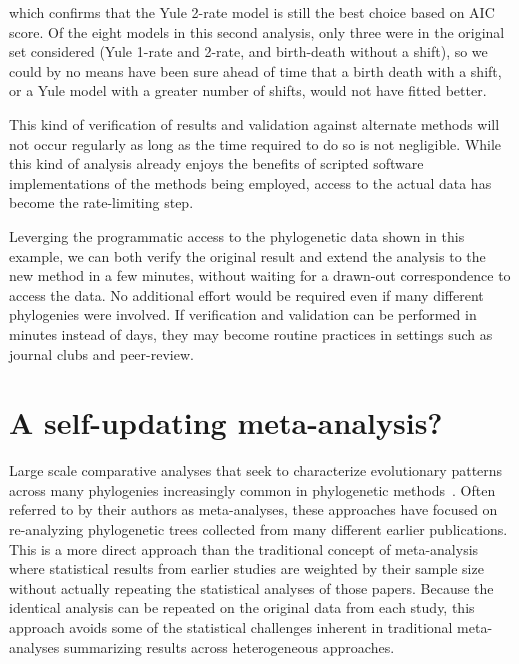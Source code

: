 \documentclass[authoryear, preprint]{elsarticle}
\begin{document}
which confirms that the Yule 2-rate  
model is still the best choice based on AIC score.  
Of the eight models in this second analysis, only three were in the original set considered
(Yule 1-rate and 2-rate, and birth-death without a shift),
so we could by no means have been sure ahead of time that a birth death with a shift,
or a Yule model with a greater number of shifts, would not have fitted better.  

This kind of verification of results and validation against alternate methods
will not occur regularly as long as the time required to do so is not negligible.  
While this kind of analysis already enjoys the benefits of scripted software implementations 
of the methods being employed, access to the actual data has become the rate-limiting step.  

Leverging the programmatic access to the phylogenetic data shown in this example,
we can both verify the original result and extend the analysis to the new method in a few minutes,
without waiting for a drawn-out correspondence to access the data.  No additional effort 
would be required even if many different phylogenies were involved. If verification and validation 
can be performed in minutes instead of days, they may become routine practices in settings such as journal clubs
and peer-review. 


\section{A self-updating meta-analysis?}
Large scale comparative analyses that seek to characterize evolutionary patterns across many phylogenies increasingly common in phylogenetic methods~\citep[\emph{e.g.}][]{McPeek2007, Phillimore2008, McPeek2008, Quental2010, Davies2011a}.  
Often referred to by their authors as meta-analyses,
these approaches have focused on re-analyzing phylogenetic trees collected from many different earlier publications.  
This is a more direct approach than the traditional concept of meta-analysis
where statistical results from earlier studies are weighted by their sample size
without actually repeating the statistical analyses of those papers.
Because the identical analysis can be repeated on the original data from each study, this approach 
avoids some of the statistical challenges inherent in traditional meta-analyses summarizing results across heterogeneous approaches.  
\end{document}
